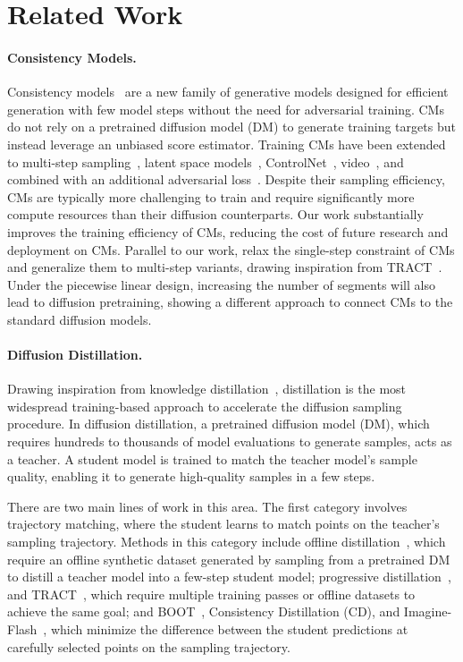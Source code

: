 \section{Related Work}


\paragraph{Consistency Models.} Consistency models~\citep{cm, ict} are a new family of generative models designed for efficient generation with few model steps without the need for adversarial training. CMs do not rely on a pretrained diffusion model (DM) to generate training targets but instead leverage an unbiased score estimator.
%
Training CMs have been extended to multi-step sampling~\citep{kim2024consistency,wang2024phased,heek2024multistep}, latent space models~\citep{luo2023latent}, ControlNet~\citep{xiao2023ccm}, video~\citep{wang2024animatelcm}, and combined with an additional adversarial loss~\citep{kim2024consistency,kong2023act}.
%
Despite their sampling efficiency, CMs are typically more challenging to train and require significantly more compute resources than their diffusion counterparts. Our work substantially improves the training efficiency of CMs, reducing the cost of future research and deployment on CMs.
% 
Parallel to our work, \citet{heek2024multistep,wang2024phased} relax the single-step constraint of CMs and generalize them to multi-step variants, drawing inspiration from TRACT~\citep{berthelot2023tract}.
Under the piecewise linear design, increasing the number of segments will also lead to diffusion pretraining, showing a different approach to connect CMs to the standard diffusion models.

\paragraph{Diffusion Distillation.} 
%
Drawing inspiration from knowledge distillation~\citep{hinton2015distilling}, distillation is the most widespread training-based approach to accelerate the diffusion sampling procedure. In diffusion distillation, a pretrained diffusion model (DM), which requires hundreds to thousands of model evaluations to generate samples, acts as a teacher. A student model is trained to match the teacher model's sample quality, enabling it to generate high-quality samples in a few steps.

There are two main lines of work in this area. The first category involves trajectory matching, where the student learns to match points on the teacher's sampling trajectory. Methods in this category include 
offline distillation~\citep{Luhman2021KnowledgeDI,dfno,geng2024one}, which require an offline synthetic dataset generated by sampling from a pretrained DM to distill a teacher model into a few-step student model; 
progressive distillation~\citep{salimans2022progressive,meng2023distillation}, and TRACT~\citep{berthelot2023tract}, which require multiple training passes or offline datasets to achieve the same goal; 
and BOOT~\citep{gu2023boot}, Consistency Distillation (CD)\citep{cm}, and Imagine-Flash~\citep{kohler2024imagine}, which minimize the difference between the student predictions at carefully selected points on the sampling trajectory.

